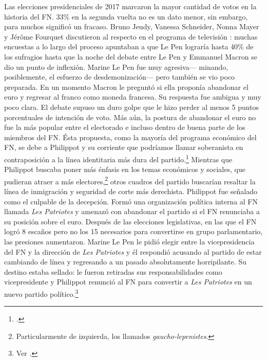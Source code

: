 Las elecciones presidenciales de 2017 marcaron la mayor cantidad de votos en la historia del FN. 33\% en la segunda vuelta no es un dato menor, sin embargo, para muchos significó un fracaso. Bruno Jeudy, Vanessa Schneider, Nonna Mayer y Jérôme Fourquet discutieron al respecto en el programa de televisión \textit{\textcite{CDansLAir17}}: muchas encuestas a lo largo del proceso apuntaban a que Le Pen lograría hasta 40\% de los sufragios hasta que la noche del debate entre Le Pen y Emmanuel Macron se dio un punto de inflexión. Marine Le Pen fue muy agresiva--- minando, posiblemente, el esfuerzo de desdemonización--- pero también se vio poco preparada. En un momento Macron le preguntó si ella proponía abandonar el euro y regresar al franco como moneda francesa. Su respuesta fue ambigua y muy poco clara. El debate supuso un duro golpe que le hizo perder al menos 5 puntos porcentuales de intención de voto. Más aún, la postura de abandonar el euro no fue la más popular entre el electorado e incluso dentro de buena parte de los miembros del FN. Ésta propuesta, como la mayoría del programa económico del FN, se debe a Philippot y su corriente que podríamos llamar soberanista en contraposición a la línea identitaria más dura del partido.\footnote{\textcites(Ver por ejemplo)(){Marin17}{Berteloot17}{Europe17}.} Mientras que Philippot buscaba poner más énfasis en los temas económicos y sociales, que pudieran atraer a más electores,\footnote{Particularmente de izquierda, los llamados \textit{gaucho-lepenistes}.} otros cuadros del partido buscarían resaltar la línea de inmigración y seguridad de corte más derechista. Philippot fue señalado como el culpable de la decepción. Formó una organización política interna al FN llamada \textit{Les Patriotes} y amenazó con abandonar el partido si el FN renunciaba a su posición sobre el euro. Después de las elecciones legislativas, en las que el FN logró 8 escaños pero no los 15 necesarios para convertirse en grupo parlamentario, las presiones aumentaron. Marine Le Pen le pidió elegir entre la vicepresidencia del FN y la dirección de \textit{Les Patriotes} y él respondió acusando al partido de estar cambiando de línea y regresando a un pasado absolutamente horripilante. Su destino estaba sellado: le fueron retiradas sus responsabilidades como vicepresidente y Philippot renunció al FN para convertir a \textit{Les Patriotes} en un nuevo partido político.\footnote{Ver \textcite{Galtier17, Zafimehy17}.}